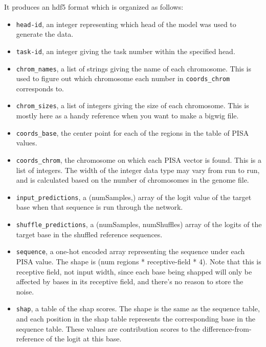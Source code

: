 \documentclass{article}
\begin{document}
It produces an hdf5 format which is organized as follows:

\begin{itemize}
        \item \texttt{head-id}, an integer representing which head of the model was used to
            generate the data.
        \item \texttt{task-id}, an integer giving the task number within the specified head.
        \item \texttt{chrom\_names}, a list of strings giving the name of each chromosome.
            This is used to figure out which chromosome each number in \texttt{coords\_chrom}
            corresponds to.
        \item \texttt{chrom\_sizes}, a list of integers giving the size of each chromosome. This
            is mostly here as a handy reference when you want to make a bigwig file.
        \item \texttt{coords\_base}, the center point for each of the regions in the table of
            PISA values.
        \item \texttt{coords\_chrom}, the chromosome on which each PISA vector is found.
            This is a list of integers. The width of the integer data type may vary from run to
            run, and is calculated based on the number of chromosomes in the genome file.
        \item \texttt{input\_predictions}, a (numSamples,) array of the logit value of the target
            base when that sequence is run through the network.
        \item \texttt{shuffle\_predictions}, a (numSamples, numShuffles) array of the logits of
            the target base in the shuffled reference sequences.
        \item \texttt{sequence}, a one-hot encoded array representing the sequence under each
            PISA value. The shape is (num regions * receptive-field * 4). Note that this is
            receptive field, not input width, since each base being shapped will only be affected
            by bases in its receptive field, and there's no reason to store the noise.
        \item \texttt{shap}, a table of the shap scores. The shape is the same as the sequence
            table, and each position in the shap table represents the corresponding base in the
            sequence table. These values are contribution scores to the difference-from-reference
            of the logit at this base.

\end{itemize}
\end{document}
